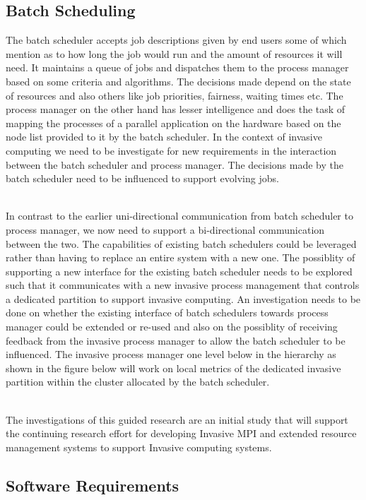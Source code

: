 \documentclass[a4paper, 12pt]{article}
\begin{document}
\subsection{Batch Scheduling}
The batch scheduler accepts job descriptions given by end users some of which mention as to how long the job would run and the amount of resources it will need. It maintains a queue of jobs and dispatches them to the process manager based on some criteria and algorithms. The decisions made depend on the state of resources and also others like job priorities, fairness, waiting times etc. The process manager on the other hand has lesser intelligence and does the task of mapping the processes of a parallel application on the hardware based on the node list provided to it by the batch scheduler. In the context of invasive computing we need to be investigate for new requirements in the interaction between the batch scheduler and process manager. The decisions made by the batch scheduler need to be influenced to support evolving jobs.\par
\noindent
\\In contrast to the earlier uni-directional communication from batch scheduler to process manager, we now need to support a bi-directional communication between the two. The capabilities of existing batch schedulers could be leveraged rather than having to replace an entire system with a new one. The possiblity of supporting a new interface for the existing batch scheduler needs to be explored such that it communicates with a new invasive process management that controls a dedicated partition to support invasive computing. An investigation needs to be done on whether the existing interface of batch schedulers towards process manager could be extended or re-used and also on the possiblity of receiving feedback from the invasive process manager to allow the batch scheduler to be influenced. The invasive process manager one level below in the hierarchy as shown in the figure below will work on local metrics of the dedicated invasive partition within the cluster allocated by the batch scheduler.\par
\noindent
\\The investigations of this guided research are an initial study that will support the continuing research effort for developing Invasive MPI and extended resource management systems to support Invasive computing systems.

\subsection{Software Requirements}
\newpage
\end{document}
